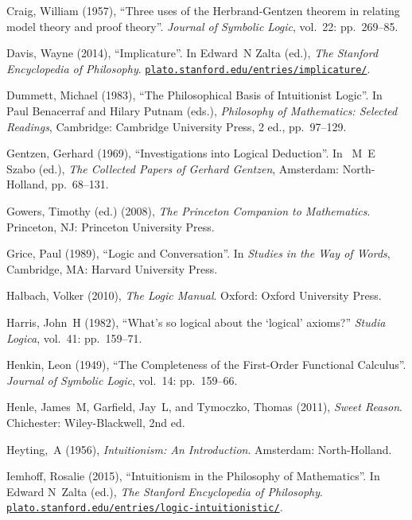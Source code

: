 \documentclass[openany,leqno,11pt]{book}
\theoremstyle{break}
\theoremstyle{definition}
\theoremstyle{remark}
\begin{document}
{\begin{thebibliography}{39}
Craig, William (1957), \enquote{Three uses of the Herbrand-Gentzen theorem in
  relating model theory and proof theory}. \emph{Journal of Symbolic Logic},
  vol.~22: pp.~269–85.

Davis, Wayne (2014), \enquote{Implicature}. In Edward~N Zalta (ed.), \emph{The Stanford Encyclopedia of Philosophy}. \urlprefix\href{http://plato.stanford.edu/entries/implicature/}{\nolinkurl{plato.stanford.edu/entries/implicature/}}.

Dummett, Michael (1983), \enquote{The Philosophical Basis of Intuitionist
  Logic}. In Paul Benacerraf and Hilary Putnam (eds.), \emph{Philosophy of
  Mathematics: Selected Readings}, Cambridge: Cambridge University Press, 2
  ed., pp.~97–129.

Gentzen, Gerhard (1969), \enquote{Investigations into Logical Deduction}. In
 ~M~E Szabo (ed.), \emph{The Collected Papers of Gerhard Gentzen},
  Amsterdam: North-Holland, pp.~68–131.

Gowers, Timothy (ed.) (2008), \emph{The Princeton Companion to Mathematics}. Princeton, NJ: Princeton University Press.

Grice, Paul (1989), \enquote{Logic and Conversation}. In \emph{Studies in the
  Way of Words}, Cambridge, MA: Harvard University Press.

Halbach, Volker (2010), \emph{The Logic Manual}. Oxford: Oxford University
  Press.

Harris, John~H (1982), \enquote{What's so logical about the `logical' axioms?}
  \emph{Studia Logica}, vol.~41: pp.~159–71.

Henkin, Leon (1949), \enquote{The Completeness of the First-Order Functional
  Calculus}. \emph{Journal of Symbolic Logic}, vol.~14: pp.~159–66.

Henle, James~M, Garfield, Jay~L, and Tymoczko, Thomas (2011), \emph{Sweet Reason}. Chichester: Wiley-Blackwell, 2nd ed.


Heyting,~A (1956), \emph{Intuitionism: An Introduction}. Amsterdam:
  North-Holland.

 Iemhoff, Rosalie (2015), \enquote{Intuitionism in the Philosophy of Mathematics}. In Edward N~Zalta (ed.), \emph{The Stanford Encyclopedia of Philosophy}. \href{http://plato.stanford.edu/entries/logic-intuitionistic/}{\nolinkurl{plato.stanford.edu/entries/logic-intuitionistic/}}.


\end{thebibliography}}
\end{document}
